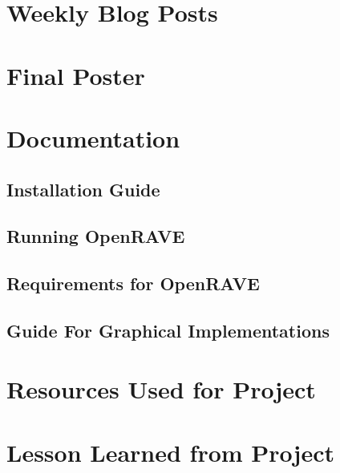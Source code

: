 \documentclass[10pt,journal,compsoc,draftclsnofoot]{IEEEtran}
\begin{document}
\begin{flushleft}
\begin{center}
\begin{table}[H]
\begin{tabular}{ | p{0.3\linewidth} | p{0.3\linewidth} | p{0.3\linewidth} | }
\end{tabular}
\newline
\label{table:TechReviewUpdate}
\end{table}
\end{center}

\newpage

\section{Weekly Blog Posts}


\section{Final Poster}



\section{Documentation}

\subsection{Installation Guide}

\subsection{Running OpenRAVE}

\subsection{Requirements for OpenRAVE}

\subsection{Guide For Graphical Implementations}


\section{Resources Used for Project}



\section{Lesson Learned from Project}


\end{flushleft}
\end{document}
